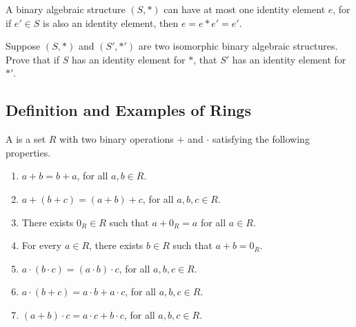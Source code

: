\documentclass[11pt,fleqn,dvipsnames,usenames]{article}
\begin{document}
%
\begin{remark}\label{uniqueidentities}
A binary algebraic structure $(S,*)$ can have at most one identity element $e$, for if $e'\in S$ is also an identity element, then $e = e*e' = e'$.
\end{remark}
%
\begin{exercise}
Suppose $(S,*)$ and $(S',*')$ are two isomorphic binary algebraic structures.  Prove that if $S$ has an identity element for $*$, that $S'$ has an identity element for $*'$.
\end{exercise}

\subsection{Definition and Examples of Rings}

\begin{definition}\label{ringdefinition}
A  is a set $R$ with two binary operations $+$ and $\cdot$ satisfying the following properties.
\begin{enumerate}[(1)]
\item $a + b = b + a$, for all $a,b\in R$.\label{commutativityofaddition}
\item $a + (b + c) = (a + b) + c$, for all $a,b,c\in R$.\label{associativityofaddition}
\item There exists $0_{R}\in R$ such that $a + 0_{R} = a$ for all $a\in R$.\label{additiveidentity}
\item For every $a\in R$, there exists $b\in R$ such that $a + b = 0_{R}$.\label{additiveinverse}
\item $a\cdot(b\cdot c) = (a\cdot b)\cdot c$, for all $a,b,c\in R$.\label{associativityofmultiplication}
\item $a\cdot(b + c) = a\cdot b + a\cdot c$, for all $a,b,c\in R$.\label{leftdistributivity}
\item $(a + b)\cdot c = a\cdot c + b\cdot c$, for all $a,b,c\in R$.\label{rightdistributivity}
\end{enumerate}
\end{definition}
%
\end{document}
